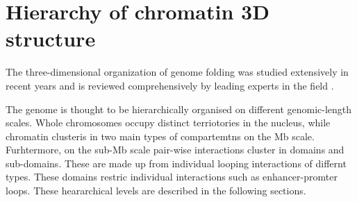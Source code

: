 \documentclass[a4paper,twoside=true,openright,parskip=full,chapterprefix=true,11pt,headings=normal,bibliography=totoc,listof=totoc,titlepage=on,captions=tableabove,draft=false]{scrreprt}
\theoremstyle{definition}
\theoremstyle{definition}
\theoremstyle{definition}
\theoremstyle{remark}
\begin{document}
\hypertarget{hierarchy-of-chromatin-3d-structure}{%
\section{Hierarchy of chromatin 3D
structure}\label{hierarchy-of-chromatin-3d-structure}}

The three-dimensional organization of genome folding was studied
extensively in recent years and is reviewed comprehensively by leading
experts in the field
\citep{Pombo2015, Sexton2015, Bouwman2015, Dekker2016, Dixon2016, Schmitt2016, Bonev2016, Hnisz2016a, Merkenschlager2016, Long2016, Rowley2016, Ruiz-Velasco2017, Andrey2017}.

The genome is thought to be hierarchically organised on different
genomic-length scales. Whole chromosomes occupy distinct terriotories in
the nucleus, while chromatin clusteris in two main types of compartemtns
on the Mb scale. Furhtermore, on the sub-Mb scale pair-wise interactions
cluster in domains and sub-domains. These are made up from individual
looping interactions of differnt types. These domains restric individual
interactions such as enhancer-promter loops. These heararchical levels
are described in the following sections.
\end{document}
